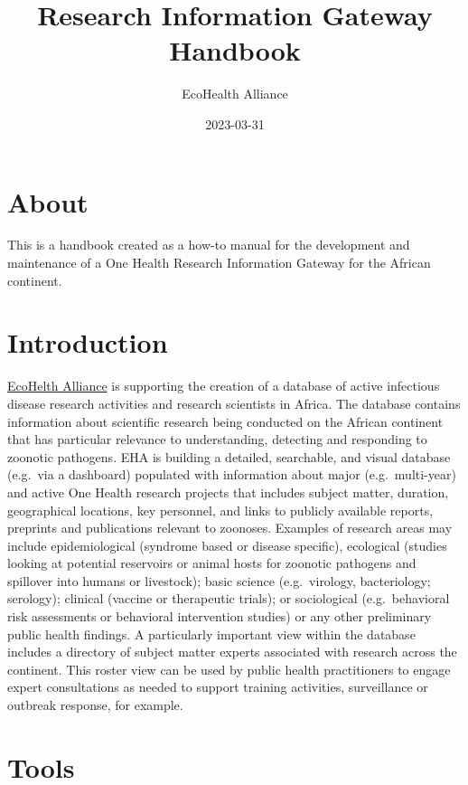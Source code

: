 \documentclass[
]{book}
\title{Research Information Gateway Handbook}
\author{EcoHealth Alliance}
\date{2023-03-31}
\begin{document}
\maketitle

{
\setcounter{tocdepth}{1}
\tableofcontents
}
\hypertarget{about}{%
\chapter{About}\label{about}}

This is a handbook created as a how-to manual for the development and maintenance of a One Health Research Information Gateway for the African continent.

\hypertarget{introduction}{%
\chapter{Introduction}\label{introduction}}

\href{https://www.ecohealthalliance.org/}{EcoHelth Alliance} is supporting the creation of a database of active infectious disease research activities and research scientists in Africa. The database contains information about scientific research being conducted on the African continent that has particular relevance to understanding, detecting and responding to zoonotic pathogens. EHA is building a detailed, searchable, and visual database (e.g.~via a dashboard) populated with information about major (e.g.~multi-year) and active One Health research projects that includes subject matter, duration, geographical locations, key personnel, and links to publicly available reports, preprints and publications relevant to zoonoses. Examples of research areas may include epidemiological (syndrome based or disease specific), ecological (studies looking at potential reservoirs or animal hosts for zoonotic pathogens and spillover into humans or livestock); basic science (e.g.~virology, bacteriology; serology); clinical (vaccine or therapeutic trials); or sociological (e.g.~behavioral risk assessments or behavioral intervention studies) or any other preliminary public health findings. A particularly important view within the database includes a directory of subject matter experts associated with research across the continent. This roster view can be used by public health practitioners to engage expert consultations as needed to support training activities, surveillance or outbreak response, for example.

\hypertarget{tools}{%
\chapter{Tools}\label{tools}}
\end{document}
